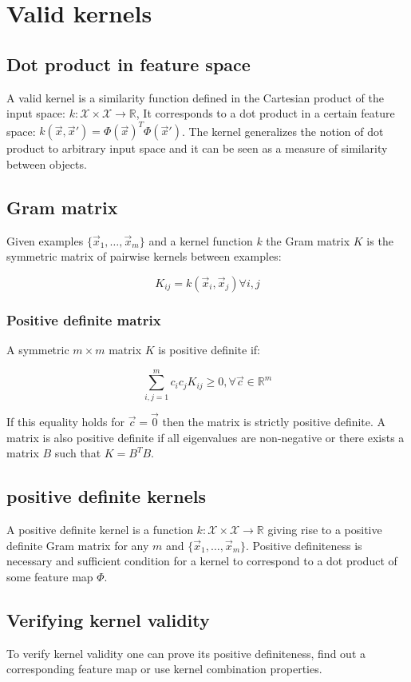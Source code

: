 \section{Valid kernels}

	\subsection{Dot product in feature space}
	A valid kernel is a similarity function defined in the Cartesian product of the input space: $k:\mathcal{X}\times\mathcal{X}\rightarrow\mathbb{R}$,
	It corresponds to a dot product in a certain feature space: $k(\vec{x},\vec{x}')=\Phi(\vec{x})^T\Phi(\vec{x}')$.
	The kernel generalizes the notion of dot product to arbitrary input space and it can be seen as a measure of similarity between objects.

	\subsection{Gram matrix}
	Given examples $\{\vec{x}_1,\dots,\vec{x}_m\}$ and a kernel function $k$ the Gram matrix $K$ is the symmetric matrix of pairwise kernels between examples:

	$$K_{ij} = k(\vec{x}_i,\vec{x}_j)\forall i,j$$

		\subsubsection{Positive definite matrix}
		A symmetric $m\times m$ matrix $K$ is positive definite if:

		$$\sum\limits_{i,j=1}^mc_ic_jK_{ij}\ge0,\forall\vec{c}\in\mathbb{R}^m$$

		If this equality holds for $\vec{c}=\vec{0}$ then the matrix is strictly positive definite.
		A matrix is also positive definite if all eigenvalues are non-negative or there exists a matrix $B$ such that $K=B^TB$.

	\subsection{positive definite kernels}
	A positive definite kernel is a function $k:\mathcal{X}\times\mathcal{X}\rightarrow\mathbb{R}$ giving rise to a positive definite Gram matrix for any $m$ and $\{\vec{x}_1,\dots,\vec{x}_m\}$.
	Positive definiteness is necessary and sufficient condition for a kernel to correspond to a dot product of some feature map $\Phi$.

	\subsection{Verifying kernel validity}
	To verify kernel validity one can prove its positive definiteness, find out a corresponding feature map or use kernel combination properties.

